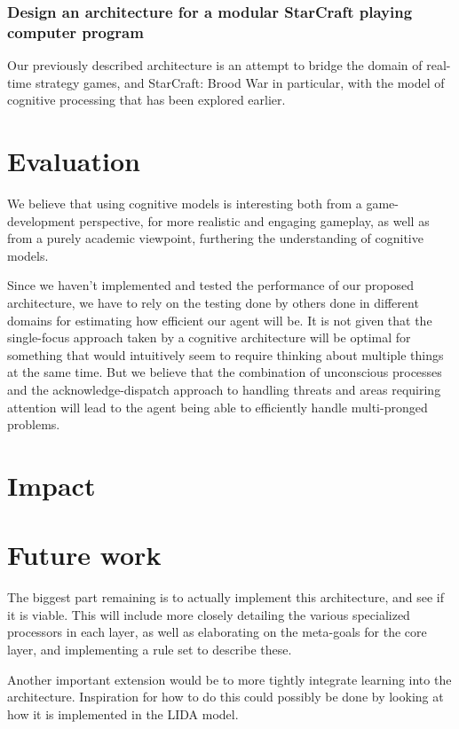 \subsubsection{Design an architecture for a modular StarCraft playing computer
program}
Our previously described architecture is an attempt to bridge the domain of
real-time strategy games, and StarCraft: Brood War in particular, with the
model of cognitive processing that has been explored earlier.


\section{Evaluation}
We believe that using cognitive models is interesting both from a
game-development perspective, for more realistic and engaging gameplay, as well
as from a purely academic viewpoint, furthering the understanding of cognitive
models.

Since we haven't implemented and tested the performance of our proposed
architecture, we have to rely on the testing done by others done in different
domains for estimating how efficient our agent will be. It is not given that the
single-focus approach taken by a cognitive architecture will be optimal for
something that would intuitively seem to require thinking about multiple things
at the same time. But we believe that the combination of unconscious processes
and the acknowledge-dispatch approach to handling threats and areas requiring
attention will lead to the agent being able to efficiently handle multi-pronged
problems.

\section{Impact}


\section{Future work}
\label{sec:futurework}
The biggest part remaining is to actually implement this architecture, and see
if it is viable. This will include more closely detailing the various
specialized processors in each layer, as well as elaborating on the meta-goals
for the core layer, and implementing a rule set to describe these.

Another important extension would be to more tightly integrate learning into
the architecture. Inspiration for how to do this could possibly be done by
looking at how it is implemented in the LIDA model\cite{franklin2007lida}.